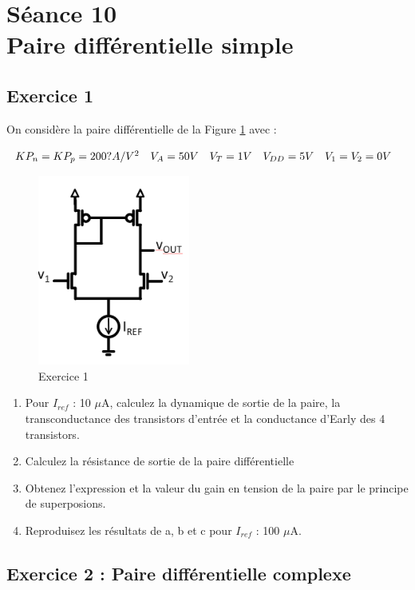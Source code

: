 \documentclass[paper=a4, fontsize=11pt]{article} %
\numberwithin{equation}{section} %
\numberwithin{figure}{section} %
\numberwithin{table}{section} %
\begin{document}
\newpage
\setcounter{figure}{0}
\setcounter{section}{10}
\section{Séance 10\\ Paire différentielle simple}
\subsection*{Exercice 1}
On considère la paire différentielle de la Figure \ref{fig11-1} avec :

$\begin{array}{l l l l l}KP_n = KP_p = 200?A/V^2&  V_A = 50V & V_T = 1V & V_{DD} = 5V & V_1 = V_2 = 0V\\ \end{array}$

\begin{figure}[!htbp]
   \centering
   \includegraphics[width=5cm]{figure/fig11-1.png}
   \caption{Exercice 1}
   \label{fig11-1}
\end{figure}

\begin{enumerate}
\item  Pour $I_{ref}$ : 10 $\mu$A, calculez la dynamique de sortie de la paire, la transconductance des transistors d'entrée et la conductance d'Early des 4 transistors.
\item  Calculez la résistance de sortie de la paire différentielle
\item  Obtenez l'expression et la valeur du gain en tension de la paire par le principe de superposions.
\item  Reproduisez les résultats de a, b et c pour $I_{ref}$ : 100 $\mu$A.
\end{enumerate}

\subsection*{Exercice 2 : Paire différentielle complexe}
\end{document}
